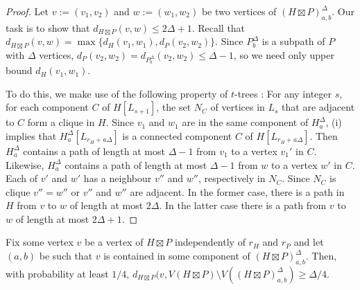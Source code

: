 \documentclass{patmorin}
\renewcommand{\ge}{\geqslant}
\renewcommand{\le}{\leqslant}
\newcommand{\david}[1]{{\color{orange} David: #1}}
\newcommand{\pat}[1]{\textcolor{Maroon}{Pat: #1}}
\begin{document}
\begin{proof}
  Let $v:=(v_1,v_2)$ and $w:=(w_1,w_2)$ be two vertices of $(H\boxtimes P)^\Delta_{a,b}$.  Our task is to show that $d_{H\boxtimes P}(v,w)\le 2\Delta+1$.  Recall that
  $d_{H\boxtimes P}(v,w)=\max\{d_{H}(v_1,w_1),d_{P}(v_2,w_2)\}$.  Since $P^\Delta_b$ is a subpath of $P$ with $\Delta$ vertices, $d_P(v_2,w_2)=d_{P^\Delta_b}(v_2,w_2)\le\Delta-1$, so we need only upper bound $d_{H}(v_1,w_1)$.

  To do this, we make use of the following property of $t$-trees \cite{KP08,DMW05}:
  For any integer $s$, 
  for each component $C$ of $H[L_{s+1}]$, 
    the set $N_C$ of vertices in $L_{s}$ that are adjacent to $C$ form a clique in $H$.
  Since $v_1$ and $w_1$ are in the same component of $H^\Delta_a$, (i) implies that $H^\Delta_a[L_{r_H+a\Delta}]$ is a connected component $C$ of $H[L_{r_H+a\Delta}]$.  Then $H^\Delta_a$ contains a path of length at most $\Delta-1$ from $v_1$ to a vertex $v_1'$ in $C$.   Likewise, $H^\Delta_a$ contains a path of length at most $\Delta-1$ from $w$ to a vertex $w'$ in $C$. Each of $v'$ and $w'$ has a neighbour $v''$ and $w''$, respectively in $N_C$.  Since $N_C$ is clique $v''=w''$ or $v''$ and $w''$ are adjacent.  In the former case, there is a path in $H$ from $v$ to $w$ of length at most $2\Delta$. In the latter case there is a path from $v$ to $w$ of length at most $2\Delta+1$.
\end{proof}

\begin{lem}\label{good_probability}
  Fix some vertex $v$ be a vertex of $H\boxtimes P$ independently of $r_H$ and $r_P$ and let $(a,b)$ be such that $v$ is contained in some component of $(H\boxtimes P)^\Delta_{a,b}$.  Then, with probability at least $1/4$,  $d_{H\boxtimes P}(v, V(H\boxtimes P)\setminus V((H\boxtimes P)^\Delta_{a,b})\ge \Delta/4$.
\end{lem}
\end{document}
